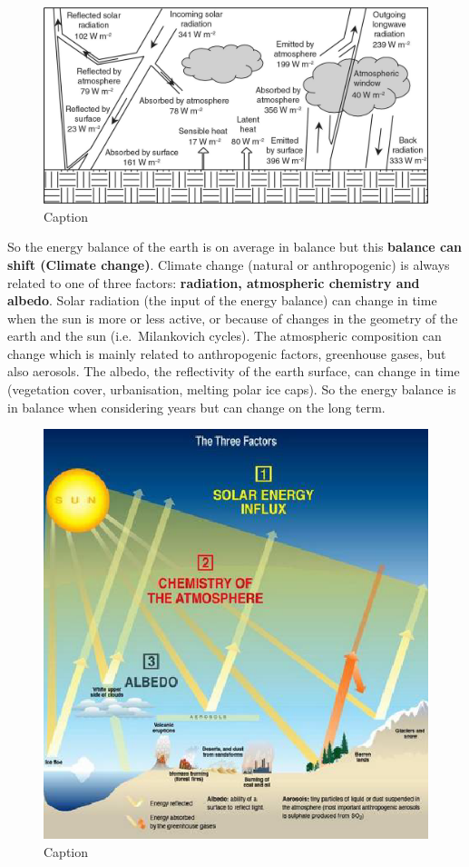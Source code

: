 \documentclass[oneside]{book}
\begin{document}
\begin{figure}

{\centering \includegraphics[width=0.5\linewidth]{figures/Figure141} 

}

\caption{Caption}\label{fig:EnergyBudget3}
\end{figure}

So the energy balance of the earth is on average in balance but this
\textbf{balance can shift (Climate change)}. Climate change (natural or
anthropogenic) is always related to one of three factors:
\textbf{radiation, atmospheric chemistry and albedo}. Solar radiation
(the input of the energy balance) can change in time when the sun is
more or less active, or because of changes in the geometry of the earth
and the sun (i.e.~Milankovich cycles). The atmospheric composition can
change which is mainly related to anthropogenic factors, greenhouse
gases, but also aerosols. The albedo, the reflectivity of the earth
surface, can change in time (vegetation cover, urbanisation, melting
polar ice caps). So the energy balance is in balance when considering
years but can change on the long term.

\begin{figure}

{\centering \includegraphics[width=0.5\linewidth]{figures/Figure142} 

}

\caption{Caption}\label{fig:EnergyBudget4}
\end{figure}
\end{document}
